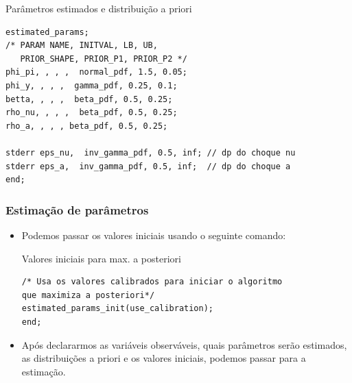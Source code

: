 \documentclass[xcolor=pdftex,dvipsnames,table]{beamer}
\newcommand{\ft}{\frametitle}
\begin{document}

%
%


\begin{frame}[fragile]

\begin{block}{Parâmetros estimados e distribuição a priori}
\begin{lstlisting}
estimated_params;
/* PARAM NAME, INITVAL, LB, UB, 
   PRIOR_SHAPE, PRIOR_P1, PRIOR_P2 */
phi_pi, , , ,  normal_pdf, 1.5, 0.05;
phi_y, , , ,  gamma_pdf, 0.25, 0.1;
betta, , , ,  beta_pdf, 0.5, 0.25;
rho_nu, , , ,  beta_pdf, 0.5, 0.25;
rho_a, , , , beta_pdf, 0.5, 0.25;

stderr eps_nu,  inv_gamma_pdf, 0.5, inf; // dp do choque nu
stderr eps_a,  inv_gamma_pdf, 0.5, inf;  // dp do choque a
end;
\end{lstlisting}

\end{block}

\end{frame}


\begin{frame}[fragile]
\ft{Estimação de parâmetros}

\begin{itemize}
\item Podemos passar os valores iniciais usando o seguinte comando:


\begin{block}{Valores iniciais para max. a posteriori}
\begin{lstlisting}
/* Usa os valores calibrados para iniciar o algoritmo
que maximiza a posteriori*/
estimated_params_init(use_calibration);
end;
\end{lstlisting}
\end{block}

\item Após declararmos as variáveis observáveis, quais parâmetros serão estimados, as distribuições a priori e os valores iniciais, podemos passar para a estimação.


\end{itemize}

\end{frame}
\end{document}

